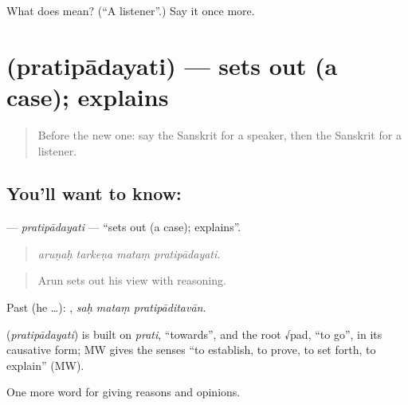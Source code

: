 \begin{tcolorbox}[breakable,colback=teal!4,colframe=teal!35!black,title={Before you move on}]
What does  mean? (\textquotedblleft{}A listener\textquotedblright{}.) Say it once more.
\end{tcolorbox}
\section[\texorpdfstring{\sk{प्रतिपादयति} (pratipādayati)}{प्रतिपादयति (pratipādayati)}]{ (pratipādayati) — sets out (a case); explains}

\label{lesson:SA-C343-pratipadayati}



\begin{quote}
Before the new one: say the Sanskrit for a speaker, then the Sanskrit for a listener.
\end{quote}

\subsection*{You'll want to know: }
\textbf{} — \emph{pratipādayati} — \textquotedblleft{}sets out (a case); explains\textquotedblright{}.

\begin{quote}
   
\end{quote}

\begin{quote}
\emph{aruṇaḥ tarkeṇa mataṃ pratipādayati.}
\end{quote}

\begin{quote}
Arun sets out his view with reasoning.
\end{quote}

Past (he …):   , \emph{saḥ mataṃ pratipāditavān}.

\begin{cousinweb}
\textbf{} (\emph{pratipādayati}) is built on \emph{prati}, \textquotedblleft{}towards\textquotedblright{}, and the root √pad, \textquotedblleft{}to go\textquotedblright{}, in its causative form; MW gives the senses \textquotedblleft{}to establish, to prove, to set forth, to explain\textquotedblright{} (MW).
\end{cousinweb}

\begin{grammarlens}[title={What you've built}]
One more word for giving reasons and opinions.
\end{grammarlens}

